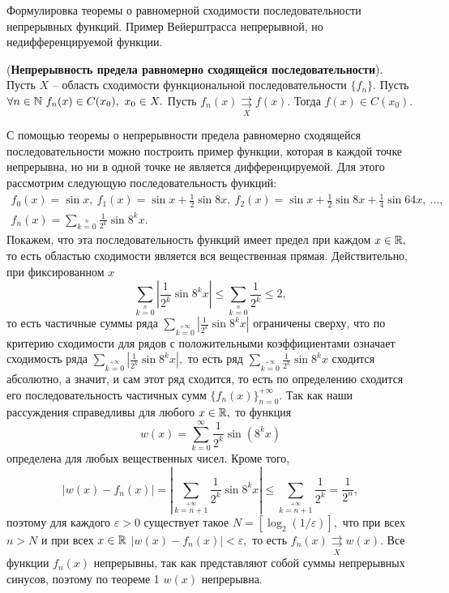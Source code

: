 \newpage
\begin{problem}
Формулировка теоремы о равномерной сходимости последовательности непрерывных
функций. Пример Вейерштрасса непрерывной, но недифференцируемой функции.
\end{problem}
\begin{theorem} (\textbf{Непрерывность предела
равномерно сходящейся последовательности}).
Пусть $X$ -- область сходимости
функциональной последовательности
$\{f_n\}.$
Пусть $\forall n \in \N \ f_n(x) \in C(x_0), \ x_0\in X.$
Пусть $f_n(x) \underset{X}\rightrightarrows f(x).$
Тогда $f(x) \in C(x_0).$
\end{theorem}
С помощью теоремы о непрерывности предела равномерно
сходящейся последовательности можно построить пример
функции, которая в каждой точке непрерывна,
но ни в одной точке не является дифференцируемой.
Для этого рассмотрим следующую последовательность
функций:
\begin{multline*}
f_0(x) = \sin x, \ f_1(x) = \sin x + \frac{1}{2} \sin 8x,
\ f_2(x) = \sin x + \frac{1}{2} \sin 8x +
\frac{1}{4} \sin 64x, \ ...,\\
f_n(x) = \sum\limits_{k=0}\limits^{n}\frac{1}{2^k} \sin 8^k x.
\end{multline*}
Покажем, что эта последовательность функций имеет предел
при каждом $x\in\mathbb{R},$ то есть областью сходимости
является вся вещественная прямая.
Действительно, при фиксированном $x$
$$
\sum\limits_{k=0}\limits^{n}\left|\frac{1}{2^k}
\sin 8^k x\right|\leq
\sum\limits_{k=0}\limits^{n}\frac{1}{2^k}\leq2,
$$
то есть частичные суммы ряда
$\sum\limits_{k=0}\limits^{+\infty}
\left|\frac{1}{2^k} \sin 8^k x\right|$ ограничены
сверху, что по критерию сходимости для рядов
с положительными коэффициентами означает
сходимость ряда $\sum\limits_{k=0}
\limits^{+\infty}\left|\frac{1}{2^k} \sin 8^k x\right|,$
то есть ряд $\sum\limits_{k=0}\limits^{+\infty}
\frac{1}{2^k} \sin 8^k x$ сходится абсолютно, а значит,
и сам этот ряд сходится, то есть по определению
сходится его последовательность частичных сумм
$\{f_n(x)\}_{n=0}^{+\infty}.$
Так как наши рассуждения справедливы для любого
$x\in\mathbb{R},$ то функция
$$
w(x) = \sum_{k=0}^\infty \frac{1}{2^k} \sin (8^k x)
$$
определена для любых вещественных чисел.
Кроме того,
$$
|w(x)-f_n(x)|=\left|\sum\limits_{k=n+1}\limits^{+\infty}
\frac{1}{2^k} \sin 8^k x\right|\leq
\sum\limits_{k=n+1}\limits^{+\infty}
\frac{1}{2^k}=\frac{1}{2^n},
$$
поэтому для каждого $\varepsilon>0$
существует такое $N=[\log_2(1/\varepsilon)],$
что при всех $n>N$ и при всех $x\in\mathbb{R}$
$|w(x)-f_n(x)|<\varepsilon,$ то есть
$f_n(x) \underset{X}\rightrightarrows w(x).$
Все функции $f_n(x)$ непрерывны, так как
представляют собой суммы непрерывных синусов,
поэтому по теореме 1 $w(x)$ непрерывна.

